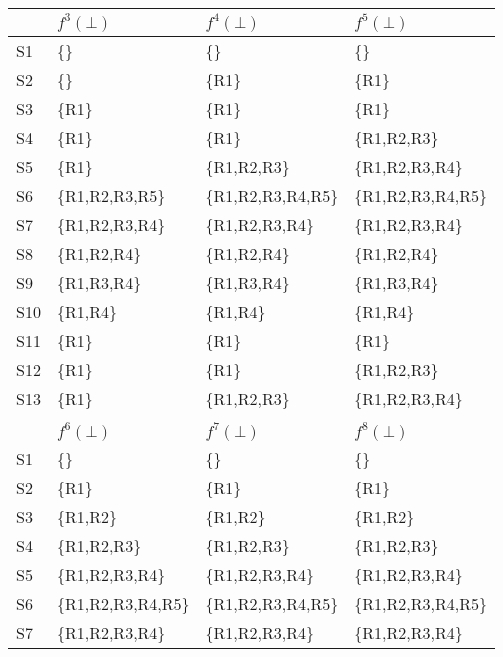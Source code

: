 \begin{slide*}
\renewcommand{\arraystretch}{1}
\renewcommand{\tabcolsep}{1.0ex}
\begin{scriptsize}
\begin{tt}
\begin{tabular}{|l|l|l|l|}
\hline
& $f^3(\bot)$ & $f^4(\bot)$ & $f^5(\bot)$ \\\hline
S1 & \{\}& \{\}& \{\}\\\hline
S2 & \{\}& \{R1\}& \{R1\}\\\hline
S3 & \{R1\}& \{R1\}& \{R1\}\\\hline
S4 & \{R1\}& \{R1\}& \{R1,R2,R3\}\\\hline
S5 & \{R1\}& \{R1,R2,R3\}& \{R1,R2,R3,R4\}\\\hline
S6 & \{R1,R2,R3,R5\}& \{R1,R2,R3,R4,R5\}& \{R1,R2,R3,R4,R5\}\\\hline
S7 & \{R1,R2,R3,R4\}& \{R1,R2,R3,R4\}& \{R1,R2,R3,R4\}\\\hline
S8 & \{R1,R2,R4\}& \{R1,R2,R4\}& \{R1,R2,R4\}\\\hline
S9 & \{R1,R3,R4\}& \{R1,R3,R4\}& \{R1,R3,R4\}\\\hline
S10 & \{R1,R4\}& \{R1,R4\}& \{R1,R4\}\\\hline
S11 & \{R1\}& \{R1\}& \{R1\}\\\hline
S12 & \{R1\}& \{R1\}& \{R1,R2,R3\}\\\hline
S13 & \{R1\}& \{R1,R2,R3\}& \{R1,R2,R3,R4\}\\\hline
\multicolumn{4}{l}{}\\
%
\hline
& $f^6(\bot)$ & $f^7(\bot)$ & $f^8(\bot)$ \\\hline
S1 & \{\}& \{\}& \{\}\\\hline
S2 & \{R1\}& \{R1\}& \{R1\}\\\hline
S3 & \{R1,R2\}& \{R1,R2\}& \{R1,R2\}\\\hline
S4 & \{R1,R2,R3\}& \{R1,R2,R3\}& \{R1,R2,R3\}\\\hline
S5 & \{R1,R2,R3,R4\}& \{R1,R2,R3,R4\}& \{R1,R2,R3,R4\}\\\hline
S6 & \{R1,R2,R3,R4,R5\}& \{R1,R2,R3,R4,R5\}& \{R1,R2,R3,R4,R5\}\\\hline
S7 & \{R1,R2,R3,R4\}& \{R1,R2,R3,R4\}& \{R1,R2,R3,R4\}\\\hline

\end{tabular}
\end{tt}
\end{scriptsize}
\end{slide*}
